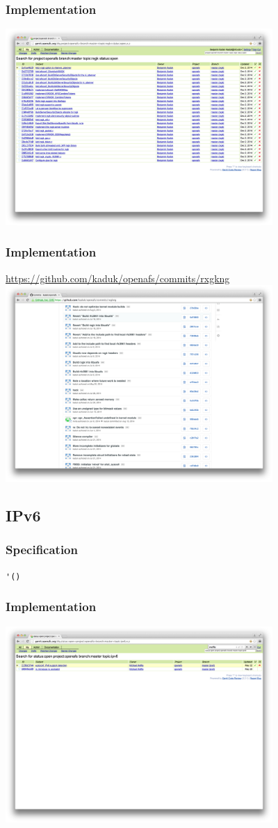 \documentclass{beamer}
\begin{document}
\begin{frame}
\frametitle{Implementation}
\includegraphics[width=4in]{gerrit-rxgk.png}
\end{frame}

\begin{frame}
\frametitle{Implementation}
\url{https://github.com/kaduk/openafs/commits/rxgkng}
\includegraphics[width=4in]{github-rxgk}
\end{frame}

\subsection{IPv6}

\begin{frame}[fragile,shrink=-800]
\frametitle{Specification}
\verb+'()+
\end{frame}

\begin{frame}
\frametitle{Implementation}
\includegraphics[width=4in]{gerrit-ipv6}
\end{frame}
\end{document}
